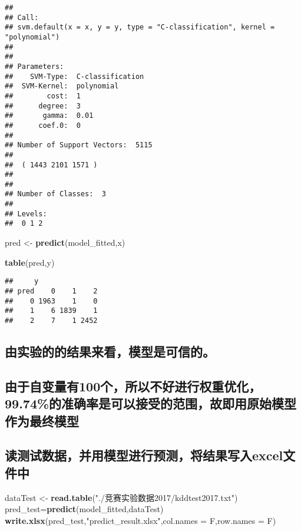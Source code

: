 \documentclass[]{article}
\newenvironment{Shaded}{\begin{snugshade}}{\end{snugshade}}
\newcommand{\KeywordTok}[1]{\textcolor[rgb]{0.13,0.29,0.53}{\textbf{{#1}}}}
\newcommand{\DataTypeTok}[1]{\textcolor[rgb]{0.13,0.29,0.53}{{#1}}}
\newcommand{\StringTok}[1]{\textcolor[rgb]{0.31,0.60,0.02}{{#1}}}
\newcommand{\NormalTok}[1]{{#1}}
\begin{document}
\begin{verbatim}
## 
## Call:
## svm.default(x = x, y = y, type = "C-classification", kernel = "polynomial")
## 
## 
## Parameters:
##    SVM-Type:  C-classification 
##  SVM-Kernel:  polynomial 
##        cost:  1 
##      degree:  3 
##       gamma:  0.01 
##      coef.0:  0 
## 
## Number of Support Vectors:  5115
## 
##  ( 1443 2101 1571 )
## 
## 
## Number of Classes:  3 
## 
## Levels: 
##  0 1 2
\end{verbatim}

\begin{Shaded}
\begin{Highlighting}[]
\NormalTok{pred <-}\StringTok{ }\KeywordTok{predict}\NormalTok{(model_fitted,x)}
\end{Highlighting}
\end{Shaded}

\begin{Shaded}
\begin{Highlighting}[]
\KeywordTok{table}\NormalTok{(pred,y)}
\end{Highlighting}
\end{Shaded}

\begin{verbatim}
##     y
## pred    0    1    2
##    0 1963    1    0
##    1    6 1839    1
##    2    7    1 2452
\end{verbatim}

\subsection{由实验的的结果来看，模型是可信的。}

\subsection{由于自变量有100个，所以不好进行权重优化，99.74\%的准确率是可以接受的范围，故即用原始模型作为最终模型}\label{10099.74}

\subsection{读测试数据，并用模型进行预测，将结果写入excel文件中}\label{excel}

\begin{Shaded}
\begin{Highlighting}[]
\NormalTok{dataTest <-}\StringTok{ }\KeywordTok{read.table}\NormalTok{(}\StringTok{"./竞赛实验数据2017/kddtest2017.txt"}\NormalTok{)}
\NormalTok{pred_test=}\KeywordTok{predict}\NormalTok{(model_fitted,dataTest)}
\KeywordTok{write.xlsx}\NormalTok{(pred_test,}\StringTok{"predict_result.xlsx"}\NormalTok{,}\DataTypeTok{col.names =} \NormalTok{F,}\DataTypeTok{row.names =} \NormalTok{F)}
\end{Highlighting}
\end{Shaded}
\end{document}
